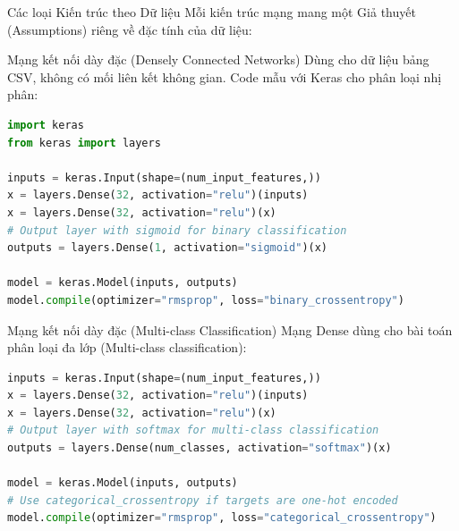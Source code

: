\documentclass[aspectratio=169]{beamer}
\begin{document}
\begin{frame}{Các loại Kiến trúc theo Dữ liệu}
    Mỗi kiến trúc mạng mang một Giả thuyết (Assumptions) riêng về đặc tính của dữ liệu:
    \begin{table}[]
        \centering
        \caption{Kiến trúc mạng ứng với các loại dữ liệu}
    \end{table}
\end{frame}

\begin{frame}[fragile]{Mạng kết nối dày đặc (Densely Connected Networks)}
    Dùng cho dữ liệu bảng CSV, không có mối liên kết không gian. Code mẫu với Keras cho phân loại nhị phân:
\begin{lstlisting}[language=Python]
import keras
from keras import layers

inputs = keras.Input(shape=(num_input_features,))
x = layers.Dense(32, activation="relu")(inputs)
x = layers.Dense(32, activation="relu")(x)
# Output layer with sigmoid for binary classification
outputs = layers.Dense(1, activation="sigmoid")(x)

model = keras.Model(inputs, outputs)
model.compile(optimizer="rmsprop", loss="binary_crossentropy")
\end{lstlisting}
\end{frame}

\begin{frame}[fragile]{Mạng kết nối dày đặc (Multi-class Classification)}
    Mạng Dense dùng cho bài toán phân loại đa lớp (Multi-class classification):
\begin{lstlisting}[language=Python]
inputs = keras.Input(shape=(num_input_features,))
x = layers.Dense(32, activation="relu")(inputs)
x = layers.Dense(32, activation="relu")(x)
# Output layer with softmax for multi-class classification
outputs = layers.Dense(num_classes, activation="softmax")(x)

model = keras.Model(inputs, outputs)
# Use categorical_crossentropy if targets are one-hot encoded
model.compile(optimizer="rmsprop", loss="categorical_crossentropy")
\end{lstlisting}
\end{frame}
\end{document}
